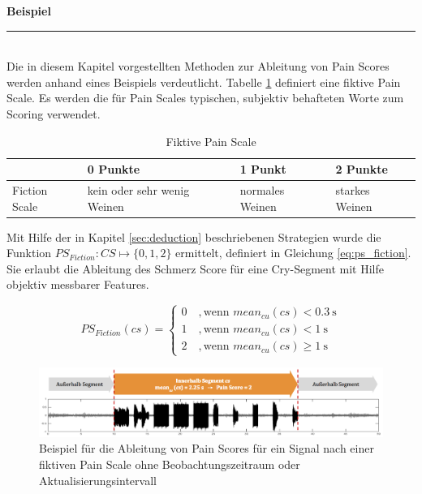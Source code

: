 \vspace{5mm}

\textbf{Beispiel} \noindent\rule{0.83\linewidth}{0.3pt}\\

Die in diesem Kapitel vorgestellten Methoden zur Ableitung von Pain Scores werden anhand eines Beispiels verdeutlicht. Tabelle \ref{tab:fiction_scale} definiert eine fiktive Pain Scale. Es werden die für Pain Scales typischen, subjektiv behafteten Worte zum Scoring verwendet.

\begin{table}[h]
\centering
\caption{Fiktive Pain Scale}
\label{tab:fiction_scale}
\begin{tabular}{@{}llll@{}}
\toprule
              & 0 Punkte    & 1 Punkt         & 2 Punkte       \\ \midrule
Fiction Scale & kein oder sehr wenig Weinen & normales Weinen & starkes Weinen \\ \bottomrule
\end{tabular}
\end{table}

Mit Hilfe der in Kapitel \ref{sec:deduction} beschriebenen Strategien wurde die Funktion $PS_{Fiction}: CS \mapsto \{0,1,2\}$ ermittelt, definiert in Gleichung \ref{eq:ps_fiction}. Sie erlaubt die Ableitung des Schmerz Score für eine Cry-Segment mit Hilfe objektiv messbarer Features.

\begin{equation}
PS_{Fiction}(cs) = \begin{cases}
 0 \quad ,  \text{wenn } mean_{cu}(cs) < \SI{0.3}{\second} \\
 1 \quad ,  \text{wenn } mean_{cu}(cs) < \SI{1}{\second} \\
 2 \quad ,  \text{wenn } mean_{cu}(cs) \geq \SI{1}{\second}
 \end{cases}	
 \label{eq:ps_fiction}
\end{equation}

\begin{figure}[h]
	\centering
	\includegraphics[width=1\textwidth]{bilder/regression_score_example04.png}
	\caption{Beispiel für die Ableitung von Pain Scores für ein Signal nach einer fiktiven Pain Scale ohne Beobachtungszeitraum oder Aktualisierungsintervall}
	\label{img:regression_score_example02}
\end{figure}


